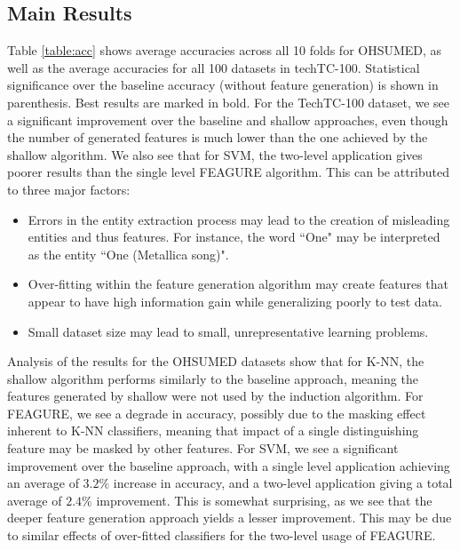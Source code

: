 \documentclass[twoside,11pt]{article}
\theoremstyle{definition}
\begin{document}
\subsection{Main Results}

Table \ref{table:acc} shows average accuracies across all 10 folds for OHSUMED, as well as the average accuracies for all 100 datasets in techTC-100. Statistical significance over the baseline accuracy (without feature generation) is shown in parenthesis. Best results are marked in bold.
For the TechTC-100 dataset, we see a significant improvement over the baseline and shallow approaches, even though the number of generated features is much lower than the one achieved by the shallow algorithm. We also see that for SVM, the two-level application gives poorer results than the single level FEAGURE algorithm. This can be attributed to three major factors:
\begin{itemize}
	\item Errors in the entity extraction process may lead to the creation of misleading entities and thus features. For instance, the word ``One" may be interpreted as the entity ``One (Metallica song)". 
	\item Over-fitting within the feature generation algorithm may create features that appear to have high information gain while generalizing poorly to test data.
	\item Small dataset size may lead to small, unrepresentative learning problems.
\end{itemize}

Analysis of the results for the OHSUMED datasets show that for K-NN, the shallow algorithm performs similarly to the baseline approach, meaning the features generated by shallow were not used by the induction algorithm. For FEAGURE, we see a degrade in accuracy, possibly due to the masking effect inherent to K-NN classifiers, meaning that impact of a single distinguishing feature may be masked by other features. For SVM, we see a significant improvement over the baseline approach, with a single level application achieving an average of $3.2\%$ increase in accuracy, and a two-level application giving a total average of $2.4\%$ improvement. This is somewhat surprising, as we see that the deeper feature generation approach yields a lesser improvement. This may be due to similar effects of over-fitted classifiers for the two-level usage of FEAGURE.
\end{document}
